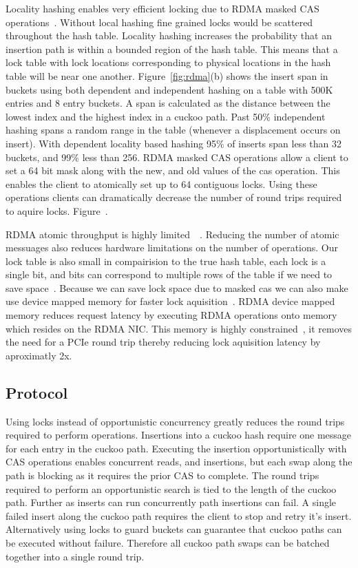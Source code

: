 Locality hashing enables very efficient locking due to RDMA
masked CAS
operations~\cite{advanced-transport,scalable-locks}. Without
local hashing fine grained locks would be scattered
throughout the hash table. Locality hashing increases the
probability that an insertion path is within a bounded
region of the hash table.  This means that a lock table with
lock locations corresponding to physical locations in the
hash table will be near one another.  
Figure~\ref{fig:rdma}(b) shows the insert span in buckets
using both dependent and independent hashing on a table with
500K entries and 8 entry buckets. A span is calculated as
the distance between the lowest index and the highest index
in a cuckoo path. Past 50\% independent hashing spans a
random range in the table (whenever a displacement occurs on
insert). With dependent locality based hashing 95\% of
inserts span less than 32 buckets, and 99\% less than 256.
RDMA masked CAS operations allow a client to set a 64 bit
mask along with the new, and old values of the cas
operation. This enables the client to atomically set up to
64 contiguous locks. Using these operations clients can
dramatically decrease the number of round trips required to
aquire locks. Figure~.

RDMA atomic throughput is highly
limited~\cite{design-guidelines}~\todo{[swordbox]}. Reducing
the number of atomic messuages also reduces hardware
limitations on the number of operations. Our lock table is
also small in compairision to the true hash table, each lock
is a single bit, and bits can correspond to multiple rows of
the table if we need to save space~. Because we can save lock space due to
masked cas we can also make use device mapped memory for
faster lock aquisition~\cite{sherman}. RDMA device mapped
memory reduces request latency by executing RDMA operations
onto memory which resides on the RDMA NIC. This memory is
highly constrained~, it removes the need
for a PCIe round trip thereby reducing lock aquisition
latency by aproximatly 2x.


\subsection{Protocol}

Using locks instead of opportunistic concurrency greatly
reduces the round trips required to perform operations.
Insertions into a cuckoo hash require one message for each
entry in the cuckoo path. Executing the insertion
opportunistically with CAS operations enables concurrent
reads, and insertions, but each swap along the path is
blocking as it requires the prior CAS to complete. The round
trips required to perform an opportunistic search is tied to
the length of the cuckoo path. Further as inserts can run
concurrently path insertions can fail. A single failed
insert along the cuckoo path requires the client to stop and
retry it's insert. Alternatively using locks to guard
buckets can guarantee that cuckoo paths can be executed
without failure. Therefore all cuckoo path swaps can be
batched together into a single round trip.

